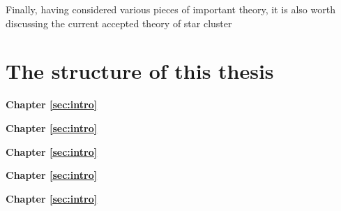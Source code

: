 Finally, having considered various pieces of important theory, it is also worth discussing the current accepted theory of star cluster 




\section{The structure of this thesis}
\label{sec:intro:structure}

\textbf{Chapter \ref{sec:intro}} \\[0.2em]
\blindtext

\textbf{Chapter \ref{sec:intro}} \\[0.2em]
\blindtext

\textbf{Chapter \ref{sec:intro}} \\[0.2em]
\blindtext

\textbf{Chapter \ref{sec:intro}} \\[0.2em]
\blindtext

\textbf{Chapter \ref{sec:intro}} \\[0.2em]
\blindtext
